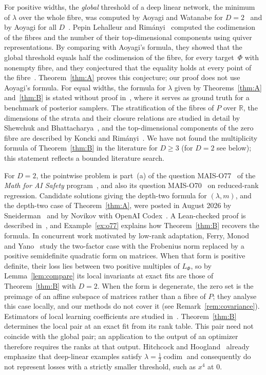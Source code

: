 \documentclass[11pt,a4paper]{article}
\theoremstyle{definition}
\theoremstyle{remark}
\numberwithin{equation}{section}
\newcommand{\R}{\mathbb{R}}
\newcommand{\codim}{\operatorname{codim}}
\begin{document}
For positive widths, the \emph{global} threshold of a deep linear network, the minimum of $\lambda$ over the whole fibre, was computed by Aoyagi and Watanabe for $D=2$~\cite{aoyagi-watanabe} and by Aoyagi for all $D$~\cite{aoyagi-2024}. Pepin Lehalleur and Rimányi~\cite{lehalleur-rimanyi} computed the codimension of the fibres and the number of their top-dimensional components using quiver representations. By comparing with Aoyagi's formula, they showed that the global threshold equals half the codimension of the fibre, for every target~$\Phi$ with nonempty fibre, and they conjectured that the equality holds at every point of the fibre~\cite[Section~8]{lehalleur-rimanyi}. Theorem~\ref{thm:A} proves this conjecture; our proof does not use Aoyagi's formula. For equal widths, the formula for $\lambda$ given by Theorems~\ref{thm:A} and~\ref{thm:B} is stated without proof in~\cite[Appendix~B, Theorem~B.5]{hitchcock-hoogland}, where it serves as ground truth for a benchmark of posterior samplers. The stratification of the fibres of $P$ over $\R$, the dimensions of the strata and their closure relations are studied in detail by Shewchuk and Bhattacharya~\cite{shewchuk-bhattacharya}, and the top-dimensional components of the zero fibre are described by Koncki and Rimányi~\cite{koncki-rimanyi}. We have not found the multiplicity formula of Theorem~\ref{thm:B} in the literature for $D\ge3$ (for $D=2$ see below); this statement reflects a bounded literature search.

For $D=2$, the pointwise problem is part~(a) of the question MAIS-O77~\cite{mais-o77} of the \emph{Math for AI Safety} program~\cite{levine-mais,mais-repo}, and also its question MAIS-O70~\cite{mais-o70} on reduced-rank regression. Candidate solutions giving the depth-two formula for $(\lambda,m)$, and the depth-two case of Theorem~\ref{thm:A}, were posted in August 2026 by Sneiderman~\cite{mais-issue-3} and by Novikov with OpenAI Codex~\cite{mais-issue-12}. A Lean-checked proof is described in~\cite{feld-o77}, and Example~\ref{ex:o77} explains how Theorem~\ref{thm:B} recovers the formula. In concurrent work motivated by low-rank adaptation, Ferry, Monod and Yano~\cite{ferry-monod-yano} study the two-factor case with the Frobenius norm replaced by a positive semidefinite quadratic form on matrices. When that form is positive definite, their loss lies between two positive multiples of $L_\Phi$, so by Lemma~\ref{lem:compare} its local invariants at exact fits are those of Theorem~\ref{thm:B} with $D=2$. When the form is degenerate, the zero set is the preimage of an affine subspace of matrices rather than a fibre of $P$; they analyse this case locally, and our methods do not cover it (see Remark~\ref{rem:covariance}). Estimators of local learning coefficients are studied in~\cite{furman-lau,lau-llc,hitchcock-hoogland}. Theorem~\ref{thm:B} determines the local pair at an exact fit from its rank table. This pair need not coincide with the global pair; an application to the output of an optimizer therefore requires the ranks at that output. Hitchcock and Hoogland~\cite[Remark~B.6]{hitchcock-hoogland} already emphasize that deep-linear examples satisfy $\lambda=\tfrac12\codim$ and consequently do not represent losses with a strictly smaller threshold, such as $x^4$ at $0$.
\end{document}
